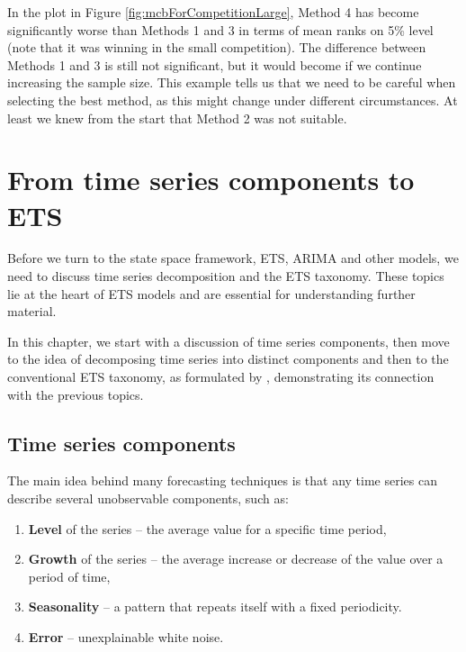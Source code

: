 \documentclass[
]{book}
\providecommand{\tightlist}{%
  \setlength{\itemsep}{0pt}\setlength{\parskip}{0pt}}
\theoremstyle{definition}
\theoremstyle{definition}
\theoremstyle{definition}
\theoremstyle{definition}
\theoremstyle{remark}
\begin{document}
In the plot in Figure \ref{fig:mcbForCompetitionLarge}, Method 4 has become significantly worse than Methods 1 and 3 in terms of mean ranks on 5\% level (note that it was winning in the small competition). The difference between Methods 1 and 3 is still not significant, but it would become if we continue increasing the sample size. This example tells us that we need to be careful when selecting the best method, as this might change under different circumstances. At least we knew from the start that Method 2 was not suitable.

\hypertarget{tsDecomposition}{%
\chapter{From time series components to ETS}\label{tsDecomposition}}

Before we turn to the state space framework, ETS, ARIMA and other models, we need to discuss time series decomposition and the ETS taxonomy. These topics lie at the heart of ETS models and are essential for understanding further material.

In this chapter, we start with a discussion of time series components, then move to the idea of decomposing time series into distinct components and then to the conventional ETS taxonomy, as formulated by \citet{Hyndman2008b}, demonstrating its connection with the previous topics.

\hypertarget{tsComponents}{%
\section{Time series components}\label{tsComponents}}

The main idea behind many forecasting techniques is that any time series can describe several unobservable components, such as:

\begin{enumerate}
\def\labelenumi{\arabic{enumi}.}
\tightlist
\item
  \textbf{Level} of the series -- the average value for a specific time period,
\item
  \textbf{Growth} of the series -- the average increase or decrease of the value over a period of time,
\item
  \textbf{Seasonality} -- a pattern that repeats itself with a fixed periodicity.
\item
  \textbf{Error} -- unexplainable white noise.
\end{enumerate}
\end{document}
